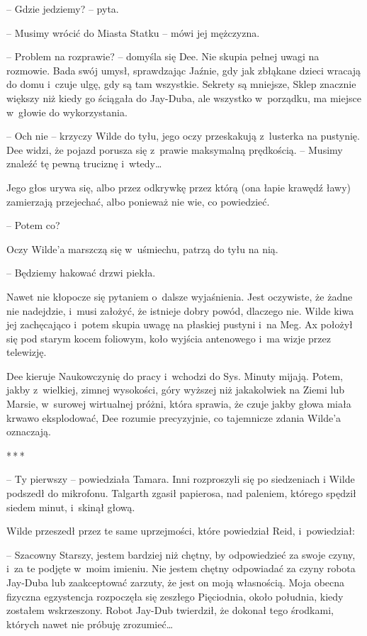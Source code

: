 \documentclass[oneside,polish,11pt,sfheadings]{mwbk}
\newcommand{\threeast}{\bigskip\par\centerline{*\,*\,*}\medskip\par}
\begin{document}
-- Gdzie jedziemy? -- pyta.

-- Musimy wrócić do Miasta Statku -- mówi jej mężczyzna.

-- Problem na rozprawie? -- domyśla się Dee. Nie skupia pełnej uwagi na
rozmowie. Bada swój umysł, sprawdzając Jaźnie, gdy jak zbłąkane dzieci
wracają do domu i~czuje ulgę, gdy są tam wszystkie. Sekrety są mniejsze,
Sklep znacznie większy niż kiedy go ściągała do Jay-Duba, ale wszystko w~porządku, ma miejsce w~głowie do wykorzystania.

-- Och nie -- krzyczy Wilde do tyłu, jego oczy przeskakują z~lusterka na
pustynię. Dee widzi, że pojazd porusza się z~prawie maksymalną
prędkością. -- Musimy znaleźć tę pewną truciznę i~wtedy\ldots

Jego głos urywa się, albo przez odkrywkę przez którą (ona łapie krawędź
ławy) zamierzają przejechać, albo ponieważ nie wie, co powiedzieć.

-- Potem co?

Oczy Wilde'a marszczą się w~uśmiechu, patrzą do tyłu na nią.

-- Będziemy hakować drzwi piekła.

Nawet nie kłopocze się pytaniem o~dalsze wyjaśnienia. Jest oczywiste, że
żadne nie nadejdzie, i~musi założyć, że istnieje dobry powód, dlaczego
nie. Wilde kiwa jej zachęcająco i~potem skupia uwagę na płaskiej
pustyni i~na Meg. Ax położył się pod starym kocem foliowym, koło
wyjścia antenowego i~ma wizje przez telewizję.

Dee kieruje Naukowczynię do pracy i~wchodzi do Sys. Minuty mijają.
Potem, jakby z~wielkiej, zimnej wysokości, góry wyższej niż jakakolwiek
na Ziemi lub Marsie, w~surowej wirtualnej próżni, która sprawia, że
czuje jakby głowa miała krwawo eksplodować, Dee rozumie precyzyjnie, co
tajemnicze zdania Wilde'a oznaczają.

\threeast

-- Ty pierwszy -- powiedziała Tamara. Inni rozproszyli się po siedzeniach
i Wilde podszedł do mikrofonu. Talgarth zgasił papierosa, nad paleniem,
którego spędził siedem minut, i~skinął głową.

Wilde przeszedł przez te same uprzejmości, które powiedział Reid, i~powiedział:

-- Szacowny Starszy, jestem bardziej niż chętny, by odpowiedzieć za swoje
czyny, i~za te podjęte w~moim imieniu. Nie jestem chętny odpowiadać za
czyny robota Jay-Duba lub zaakceptować zarzuty, że jest on moją
własnością. Moja obecna fizyczna egzystencja rozpoczęła się zeszłego
Pięciodnia, około południa, kiedy zostałem wskrzeszony. Robot Jay-Dub
twierdził, że dokonał tego środkami, których nawet nie próbuję
zrozumieć\ldots
\end{document}
